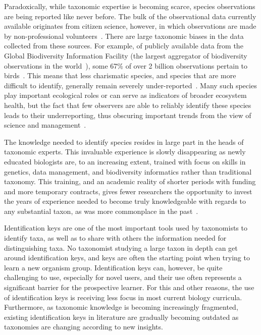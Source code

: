 \documentclass[10pt,letterpaper]{article}
\begin{document}
Paradoxically, while taxonomic expertise is becoming scarce, species observations are being reported like never before. The bulk of the observational data currently available originates from citizen science, however, in which observations are made by non-professional volunteers~\cite{Silvertown2009}. There are large taxonomic biases in the data collected from these sources. For example, of publicly available data from the Global Biodiversity Information Facility (the largest aggregator of biodiversity observations in the world~\cite{GBIFhomepage}), some 67\% of over 2 billion observations pertain to birds~\cite{GBIF_data_taxonomy}. This means that less charismatic species, and species that are more difficult to identify, generally remain severely under-reported~\cite{Troudet2017}. Many such species play important ecological roles or can serve as indicators of broader ecosystem health, but the fact that few observers are able to reliably identify these species leads to their underreporting, thus obscuring important trends from the view of science and management~\cite{Dobson2020}.

The knowledge needed to identify species resides in large part in the heads of taxonomic experts. This invaluable experience is slowly disappearing as newly educated biologists are, to an increasing extent, trained with focus on skills in genetics, data management, and biodiversity informatics rather than traditional taxonomy. This training, and an academic reality of shorter periods with funding and more temporary contracts, gives fewer researchers the opportunity to invest the years of experience needed to become truly knowledgeable with regards to any substantial taxon, as was more commonplace in the past~\cite{Ebach2011}. 
                   
Identification keys are one of the most important tools used by taxonomists to identify taxa, as well as to share with others the information needed for distinguishing taxa. No taxonomist studying a large taxon in depth can get around identification keys, and keys are often the starting point when trying to learn a new organism group. Identification keys can, however, be quite challenging to use, especially for novel users, and their use often represents a significant barrier for the prospective learner. For this and other reasons, the use of identification keys is receiving less focus in most current biology curricula. Furthermore, as taxonomic knowledge is becoming increasingly fragmented, existing identification keys in literature are gradually becoming outdated as taxonomies are changing according to new insights.
\end{document}
